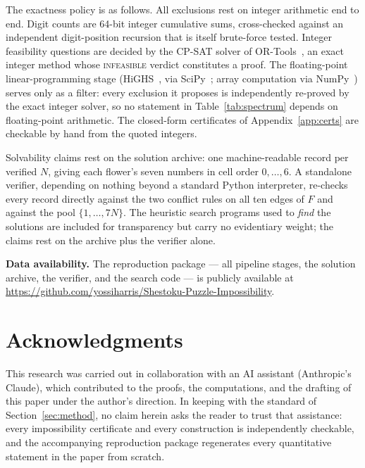 \documentclass[11pt]{article}
\theoremstyle{definition}
\theoremstyle{remark}
\begin{document}
The exactness policy is as follows. All exclusions rest on integer arithmetic end to end.
Digit counts are 64-bit integer cumulative sums, cross-checked against an independent
digit-position recursion that is itself brute-force tested. Integer feasibility questions
are decided by the CP-SAT solver of OR-Tools~\cite{ORtools}, an exact integer method whose
\textsc{infeasible} verdict constitutes a proof. The floating-point linear-programming
stage (HiGHS~\cite{HighsHH18}, via SciPy~\cite{SciPy2020}; array computation via
NumPy~\cite{NumPy2020}) serves only as a filter: every exclusion it proposes is
independently re-proved by the exact integer solver, so no statement in Table~\ref{tab:spectrum}
depends on floating-point arithmetic. The closed-form certificates of
Appendix~\ref{app:certs} are checkable by hand from the quoted integers.

Solvability claims rest on the solution archive: one machine-readable record per verified
$N$, giving each flower's seven numbers in cell order $0,\dots,6$. A standalone verifier,
depending on nothing beyond a standard Python interpreter, re-checks every record directly
against the two conflict rules on all ten edges of $F$ and against the pool
$\{1,\dots,7N\}$. The heuristic search programs used to \emph{find} the solutions are
included for transparency but carry no evidentiary weight; the claims rest on the archive
plus the verifier alone.

\medskip
\noindent\textbf{Data availability.} The reproduction package --- all pipeline stages, the
solution archive, the verifier, and the search code --- is publicly available at
\url{https://github.com/yossiharris/Shestoku-Puzzle-Impossibility}.

\section*{Acknowledgments}
This research was carried out in collaboration with an AI assistant (Anthropic's Claude),
which contributed to the proofs, the computations, and the drafting of this paper under the
author's direction. In keeping with the standard of Section~\ref{sec:method}, no claim herein
asks the reader to trust that assistance: every impossibility certificate and every
construction is independently checkable, and the accompanying reproduction package regenerates
every quantitative statement in the paper from scratch.
\end{document}
